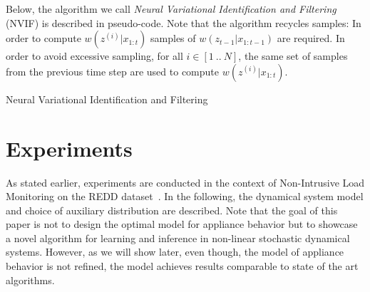 Below, the algorithm we call \emph{Neural Variational Identification and Filtering} (NVIF) is described in pseudo-code. Note that the algorithm recycles samples: In order to compute $w(z^{(i)}|x_{1:t})$ samples of $w(z_{t-1}|x_{1:t-1})$ are required. In order to avoid excessive sampling, for all $i \in [1\ ..\ N]$, the same set of samples from the previous time step are used to compute $w(z^{(i)}|x_{1:t})$.

\begin{algorithm}


\caption{Neural Variational Identification and Filtering}
\end{algorithm}



\section{Experiments}
\label{sec:expmts}

As stated earlier, experiments are conducted in the context of Non-Intrusive Load Monitoring on the REDD dataset~\cite{kolter2011redd}. In the following, the dynamical system model and choice of auxiliary distribution are described. Note that the goal of this paper is not to design the optimal model for appliance behavior but to showcase a novel algorithm for learning and inference in non-linear stochastic dynamical systems. However, as we will show later, even though, the model of appliance behavior is not refined, the model achieves results comparable to state of the art algorithms. 

